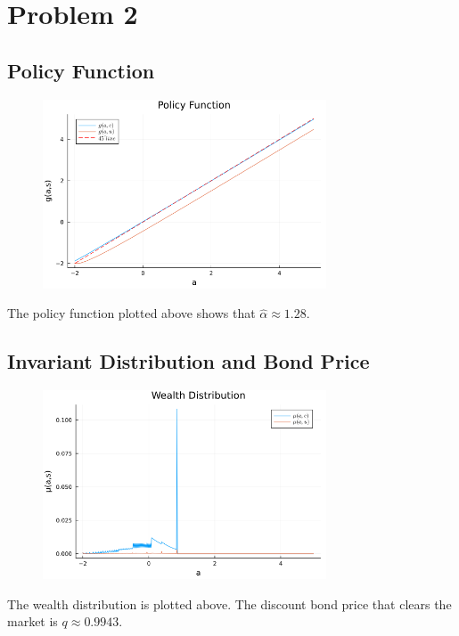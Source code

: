 \documentclass[10pt]{article}
\begin{document}
\newpage
\section{Problem 2}

\subsection{Policy Function}

\begin{figure}[!h]
    \centering 
    \includegraphics[width = 0.75\textwidth]{policy_function.png}
\end{figure}

The policy function plotted above shows that $\hat{\alpha} \approx 1.28$. 

\subsection{Invariant Distribution and Bond Price }
\begin{figure}[!h]
    \centering 
    \includegraphics[width = 0.75\textwidth]{cross_sectional_distribution.png}
\end{figure}

The wealth distribution is plotted above. The discount bond price that clears the market is $ q \approx 0.9943$. 
\end{document}
